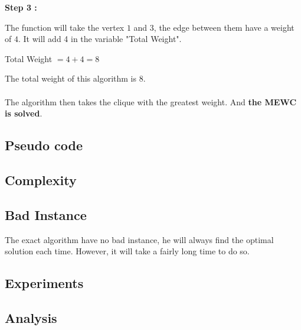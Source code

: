     \hspace*{1cm}  \textbf{Step 3 :}
    \\
    \begin{minipage}{0.4\textwidth}
    \end{minipage}
    \begin{minipage}{0.6\textwidth}
        The function will take the vertex $1$ and $3$, the edge between them have a weight of $4$. It will add 4 in the variable "Total Weight".
    \end{minipage}
    \begin{center}
        Total Weight $= 4 + 4 = 8$
    \end{center}

    The total weight of this algorithm is 8.
    \\ \\
    The algorithm then takes the clique with the greatest weight. And \textbf{the MEWC is solved}.


\subsection{Pseudo code}


\subsection{Complexity}


\subsection{Bad Instance}
    
    The exact algorithm have no bad instance, he will always find the optimal solution each time. However, it will take a fairly long time to do so.


\subsection{Experiments}


\subsection{Analysis}

\newpage